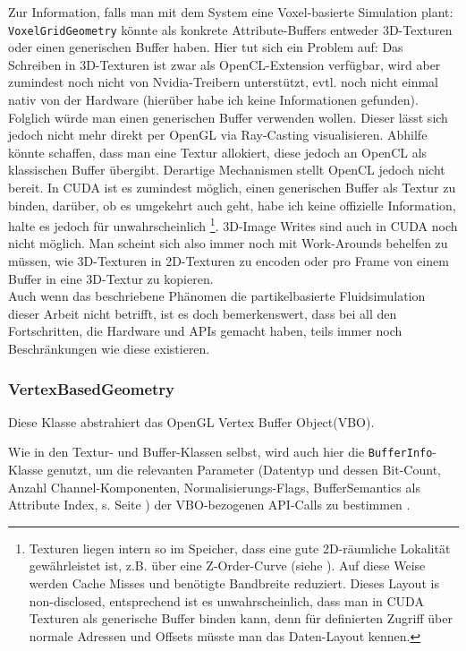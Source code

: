 		Zur Information, falls man mit dem System eine Voxel-basierte Simulation plant:\\
		\lstinline|VoxelGridGeometry|  könnte als konkrete Attribute-Buffers
		entweder 3D-Texturen oder einen generischen Buffer haben. Hier tut sich ein Problem auf:
		Das Schreiben in 3D-Texturen ist zwar als OpenCL-Extension verfügbar, wird aber zumindest noch nicht
		von Nvidia-Treibern unterstützt, evtl. noch nicht einmal nativ von der Hardware (hierüber habe ich keine
		Informationen gefunden).
		Folglich würde man einen generischen Buffer verwenden wollen.
		Dieser lässt sich jedoch nicht mehr direkt per OpenGL via Ray-Casting visualisieren.
		Abhilfe könnte schaffen, dass man eine Textur allokiert, diese jedoch an OpenCL als klassischen Buffer übergibt.
		Derartige Mechanismen stellt OpenCL jedoch nicht bereit. In CUDA ist es zumindest möglich, einen generischen 
		Buffer als Textur zu binden, darüber, ob es umgekehrt auch geht, habe ich keine offizielle Information, halte
		es jedoch für unwahrscheinlich 
		\footnote{Texturen liegen intern so im Speicher, dass eine gute 2D-räumliche Lokalität gewährleistet ist, z.B.
		über eine Z-Order-Curve (siehe \cite{wiki:ZCurve}). Auf diese Weise werden Cache Misses und 	
		benötigte Bandbreite reduziert. Dieses Layout is non-disclosed, entsprechend ist es unwahrscheinlich,
		dass man in CUDA Texturen als generische Buffer binden kann, denn für definierten Zugriff über normale
		Adressen und Offsets müsste man das Daten-Layout kennen.}.
		3D-Image Writes sind auch in CUDA noch nicht möglich. Man scheint sich also immer noch
		mit Work-Arounds behelfen zu müssen, wie 3D-Texturen in 2D-Texturen zu encoden oder pro Frame von einem Buffer
		in eine 3D-Textur zu kopieren.\\
		Auch wenn das beschriebene Phänomen die partikelbasierte Fluidsimulation dieser Arbeit nicht betrifft, 
		ist es doch bemerkenswert, dass bei all den
		Fortschritten, die Hardware und APIs gemacht haben, teils immer noch Beschränkungen wie diese
		existieren.


	\subsubsection{VertexBasedGeometry}
	\label{sec:VertexBasedGeometry}
	
	Diese Klasse abstrahiert das OpenGL Vertex Buffer Object(VBO).
	
	Wie in den Textur- und Buffer-Klassen selbst, wird auch hier die \lstinline|BufferInfo|-Klasse genutzt,
	um die relevanten Parameter (Datentyp und dessen Bit-Count, 
	Anzahl Channel-Komponenten, Normalisierungs-Flags, BufferSemantics als Attribute Index, 
	s. Seite \pageref{item:BufferSemantics}) der VBO-bezogenen API-Calls zu bestimmen .
	
